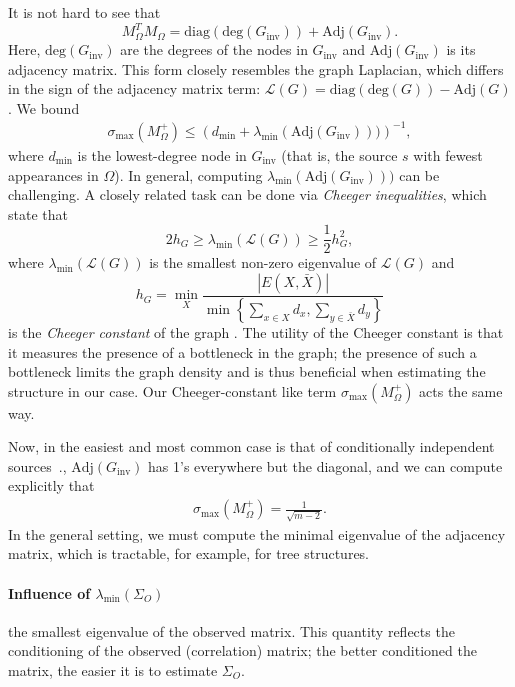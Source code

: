 \documentclass[letterpaper]{article}
\begin{document}
\begin{appendix}
It is not hard to see that \[M_{\Omega}^TM_{\Omega}  = \text{diag}(\text{deg}(G_{\text{inv}})) + \text{Adj}(G_{\text{inv}}).\] Here, $\text{deg}(G_{\text{inv}})$ are the degrees of the nodes in $G_{\text{inv}}$ and $\text{Adj}(G_{\text{inv}})$ is its adjacency matrix. This form closely resembles the graph Laplacian, which differs in the sign of the adjacency matrix term: $\mathcal{L}(G) = \text{diag}(\text{deg}(G)) - \text{Adj}(G)$. We bound
\begin{align*}
  \sigma_{\max}(M_\Omega^{+})  \leq  \left(d_{\min} + \lambda_{\min}(\text{Adj}(G_{\text{inv}})))\right)^{-1},
\end{align*}
where $d_{\min}$ is the lowest-degree node in $G_{\text{inv}}$ (that is, the source $s$ with fewest appearances in $\Omega$). In general, computing $ \lambda_{\min}(\text{Adj}(G_{\text{inv}})))$ can be challenging. A closely related task can be done via \emph{Cheeger inequalities}, which state that 
\[2h_G  \geq \lambda_{\min}(\mathcal{L}(G)) \geq \frac{1}{2}h_G^2,\]
where $\lambda_{\min}(\mathcal{L}(G))$ is the smallest non-zero eigenvalue of $\mathcal{L}(G)$ and \[h_G = \min_{X} \frac{|E(X,\bar{X})|}{\min \left \{ \sum_{x \in X} d_x, \sum_{y \in \bar{X}} d_y \right \}}\] is the \emph{Cheeger constant} of the graph \cite{cheeger}. The utility of the Cheeger constant is that it measures the presence of a bottleneck in the graph; the presence of such a bottleneck limits the graph density and is thus beneficial when estimating the structure in our case. Our Cheeger-constant like term $\sigma_{\max}(M_{\Omega}^+)$ acts the same way.

Now, in the easiest and most common case is that of conditionally independent sources~\cite{dalvi:www13,zhang2014spectral,dalvi:www13,karger2011iterative}., $\text{Adj}(G_{\text{inv}})$ has 1's everywhere but the diagonal, and we can compute explicitly that 
\begin{align*}
\sigma_{\max}(M_\Omega^{+})  = \frac{1}{\sqrt{m-2}}.
\end{align*} 
In the general setting, we must compute the minimal eigenvalue of the adjacency matrix, which is tractable, for example, for tree structures.  

\paragraph*{Influence of $\lambda_{\min}(\Sigma_O)$} the smallest eigenvalue of the observed matrix. This quantity reflects the conditioning of the observed (correlation) matrix; the better conditioned the matrix, the easier it is to estimate $\Sigma_O$.


\end{appendix}
\end{document}
